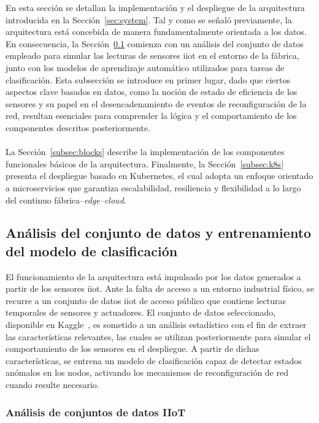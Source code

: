 En esta sección se detallan la implementación y el despliegue de la arquitectura introducida en la Sección~\ref{sec:system}. Tal y como se señaló previamente, la arquitectura está concebida de manera fundamentalmente orientada a los datos. En consecuencia, la Sección~\ref{subsec:data} comienza con un análisis del conjunto de datos empleado para simular las lecturas de sensores \gls{iiot} en el entorno de la fábrica, junto con los modelos de aprendizaje automático utilizados para tareas de clasificación. Esta subsección se introduce en primer lugar, dado que ciertos aspectos clave basados en datos, como la noción de estado de eficiencia de los sensores y su papel en el desencadenamiento de eventos de reconfiguración de la red, resultan esenciales para comprender la lógica y el comportamiento de los componentes descritos posteriormente.\\
\\
La Sección~\ref{subsec:blocks} describe la implementación de los componentes funcionales básicos de la arquitectura. Finalmente, la Sección~\ref{subsec:k8s} presenta el despliegue basado en Kubernetes, el cual adopta un enfoque orientado a microservicios que garantiza escalabilidad, resiliencia y flexibilidad a lo largo del continuo fábrica–\textit{edge–cloud}.

\subsection{Análisis del conjunto de datos y entrenamiento del modelo de clasificación}
\label{subsec:data}

El funcionamiento de la arquitectura está impulsado por los datos generados a partir de los sensores \gls{iiot}. Ante la falta de acceso a un entorno industrial físico, se recurre a un conjunto de datos \gls{iiot} de acceso público que contiene lecturas temporales de sensores y actuadores. El conjunto de datos seleccionado, disponible en Kaggle~\cite{intelligent_manufacturing_dataset}, es sometido a un análisis estadístico con el fin de extraer las características relevantes, las cuales se utilizan posteriormente para simular el comportamiento de los sensores en el despliegue. A partir de dichas características, se entrena un modelo de clasificación capaz de detectar estados anómalos en los nodos, activando los mecanismos de reconfiguración de red cuando resulte necesario.


\subsubsection{Análisis de conjuntos de datos IIoT}

